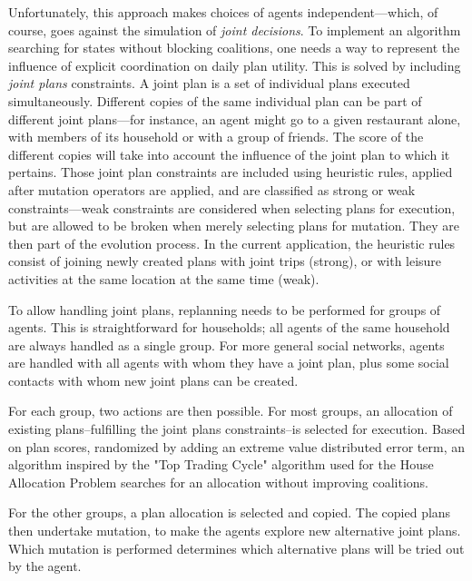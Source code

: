 {Unfortunately, this approach makes choices of agents independent---which, of course, goes against the simulation of \emph{joint decisions}. To implement an algorithm searching for states without
blocking coalitions, one needs a way to represent the influence of explicit coordination on daily plan utility. This is solved by including \emph{joint plans} constraints. A joint plan is a set of
individual plans executed simultaneously. Different copies of the same individual plan can be part of different joint plans---for instance, an agent might go to a given restaurant alone, with members of its
household or with a group of friends. The score of the different copies will take into account the influence of the joint plan to which it pertains. Those joint plan constraints are included using heuristic
rules, applied after mutation operators are applied, and are classified as strong or weak constraints---weak constraints are considered when selecting plans for execution, but are allowed to be broken when merely selecting plans for mutation. They are then part of the evolution process. In the current application, the heuristic rules consist of joining newly created plans with joint trips (strong), or with leisure activities at the same location at the same time (weak).

To allow handling joint plans, replanning needs to be performed for groups of agents. This is straightforward for households; all agents of the same household are always handled as a single group. For more general social networks, agents are handled with all agents with whom they have a joint plan, plus some social contacts with whom new joint plans can be created.

For each group, two actions are then possible. For most groups, an allocation of existing plans--fulfilling the joint plans constraints--is selected for execution. Based on plan scores, randomized by adding an extreme value distributed error term, an algorithm inspired by the "Top Trading Cycle" algorithm used for the House Allocation Problem \citep{SchummerVohra_NisanEtAl_2007} searches for an allocation without improving coalitions.

For the other groups, a plan allocation is selected and copied. The copied plans then undertake mutation, to make the agents explore new alternative joint plans. Which mutation is performed  determines which alternative plans will be tried out by the agent.

}
